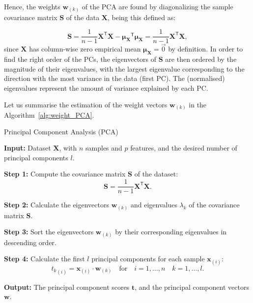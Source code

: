 Hence, the weights $\mathbf{w}_{(k)}$ of the PCA are found by diagonalizing the sample covariance matrix $\mathbf{S}$ of the data $\mathbf{X}$, being this defined as:

\begin{equation}
\mathbf{S} =  \frac{1}{n-1} \mathbf{X}^{\mathsf{T}} \mathbf{X} -  \mathbf{\mu_X}^{\mathsf{T}}\mathbf{\mu_X}= \frac{1}{n-1} \mathbf{X}^{\mathsf{T}} \mathbf{X},
\end{equation}
since $\mathbf{X}$ has column-wise zero empirical mean $\mathbf{\mu_X}=\vec{0}$ by definition. 
In order to find the right order of the PCs, the eigenvectors of $\mathbf{S}$ are then ordered by the magnitude of their eigenvalues, with the largest eigenvalue corresponding to the direction with the most variance in the data (first PC). The (normalised) eigenvalues represent the amount of variance explained by each PC.

Let us summarise the estimation of the weight vectors $\mathbf{w}_{(k)}$ in the Algorithm~\ref{alg:weight_PCA}.

\begin{algorithm}
\caption{Principal Component Analysis (PCA)}\label{alg:weight_PCA}
\begin{algorithmic}[1]
    \STATE \textbf{Input:} Dataset \(\mathbf{X}\), with \(n\) samples and \(p\) features, and the desired number of principal components \(l\).

    \STATE \textbf{Step 1:} Compute the covariance matrix \(\mathbf{S}\) of the dataset:
    \begin{equation*}
    \mathbf{S} = \frac{1}{n - 1} \mathbf{X}^{\mathsf{T}} \mathbf{X}.
    \end{equation*}

    \STATE \textbf{Step 2:} Calculate the eigenvectors \(\mathbf{w}_{(k)}\) and eigenvalues \(\lambda_k\) of the covariance matrix \(\mathbf{S}\).

    \STATE \textbf{Step 3:} Sort the eigenvectors \(\mathbf{w}_{(k)}\) by their corresponding eigenvalues in descending order.

    \STATE \textbf{Step 4:} Calculate the first \(l\) principal components for each sample \(\mathbf{x}_{(i)}\):
    \begin{equation*}
    {t_{k}}_{(i)} = \mathbf{x}_{(i)} \cdot \mathbf{w}_{(k)} \quad \text{for} \quad i = 1, \ldots, n \quad k = 1, \ldots, l.
    \end{equation*}
    
    \STATE \textbf{Output:} The principal component scores \(\mathbf{t}\), and the principal component vectors \(\mathbf{w}\).
\end{algorithmic}
\end{algorithm}


